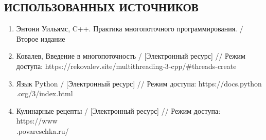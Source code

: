 \documentclass{article}
\begin{document}
\clearpage\begin{center}\section*{ ИСПОЛЬЗОВАННЫХ ИСТОЧНИКОВ}\end{center}
\begin{enumerate}
	\item Энтони Уильямс, C++. Практика многопоточного программирования. / Второе издание
	\item Ковалев, Введение в многопоточность / [Электронный ресурс] // Режим доступа: https://rekovalev.site/multithreading-3-cpp/\#threads-create
	\item Язык Python / [Электронный ресурс] // Режим доступа: https://docs.python\\.org/3/index.html
	\item Кулинарные рецепты / [Электронный ресурс] // Режим доступа: https://www\\.povareschka.ru/
 \end{enumerate}
\end{document}
